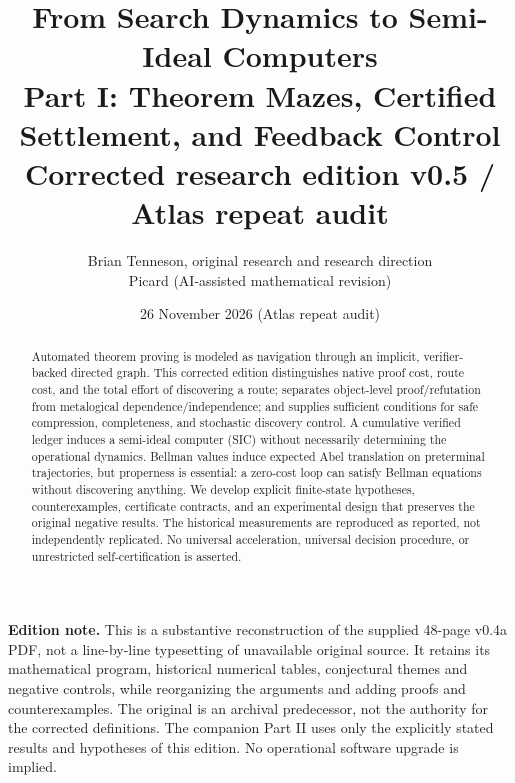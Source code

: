 \documentclass[11pt]{article}
\title{From Search Dynamics to Semi-Ideal Computers\\[5pt]\large Part I: Theorem Mazes, Certified Settlement, and Feedback Control\\\normalsize Corrected research edition v0.5 / Atlas repeat audit}
\author{Brian Tenneson, original research and research direction\\Picard (AI-assisted mathematical revision)}
\date{26 November 2026 (Atlas repeat audit)}
\theoremstyle{definition}\newtheorem{definition}[theorem]{Definition}\newtheorem{example}[theorem]{Example}\newtheorem{conjecture}[theorem]{Conjecture}
\begin{document}
\maketitle
\begin{abstract}
Automated theorem proving is modeled as navigation through an implicit, verifier-backed directed graph. This corrected edition distinguishes native proof cost, route cost, and the total effort of discovering a route; separates object-level proof/refutation from metalogical dependence/independence; and supplies sufficient conditions for safe compression, completeness, and stochastic discovery control. A cumulative verified ledger induces a semi-ideal computer (SIC) without necessarily determining the operational dynamics. Bellman values induce expected Abel translation on preterminal trajectories, but properness is essential: a zero-cost loop can satisfy Bellman equations without discovering anything. We develop explicit finite-state hypotheses, counterexamples, certificate contracts, and an experimental design that preserves the original negative results. The historical measurements are reproduced as reported, not independently replicated. No universal acceleration, universal decision procedure, or unrestricted self-certification is asserted.
\end{abstract}
\textbf{Edition note.} This is a substantive reconstruction of the supplied 48-page v0.4a PDF, not a line-by-line typesetting of unavailable original source. It retains its mathematical program, historical numerical tables, conjectural themes and negative controls, while reorganizing the arguments and adding proofs and counterexamples. The original is an archival predecessor, not the authority for the corrected definitions. The companion Part II uses only the explicitly stated results and hypotheses of this edition. No operational software upgrade is implied.
\clearpage\tableofcontents\clearpage
\end{document}
